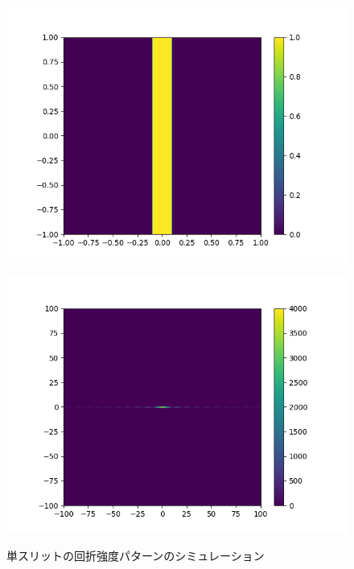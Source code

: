 \begin{figure}[htbp]
\begin{minipage}[ht]{0.48\hsize}
		\includegraphics[width=\linewidth]{src/figures/result/ss2_original_estimation.png}
		\label{subfig:amplitude_sim_single2_original}
	\end{minipage}
	\begin{minipage}[ht]{0.48\hsize}\centering
		\includegraphics[width=\linewidth]{src/figures/result/ss2_amplitude_estimation.png}
		\label{subfig:amplitude_sim_single2}
	\end{minipage}
	\caption{単スリットの回折強度パターンのシミュレーション}\label{fig:amplitude_sim_single}
\end{figure}

